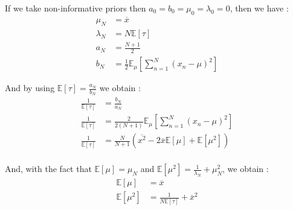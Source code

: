 \documentclass{article}
\begin{document}
If we take non-informative priors then $a_0 = b_0 = \mu_0 = \lambda_0 = 0$, then we have :
\begin{equation}
    \begin{split}
        \mu_N     & = \overline{x}                                                      \\
        \lambda_N & = N\mathbb{E}[\tau]                                                 \\
        a_N       & = \frac{N+1}{2}                                                     \\
        b_N       & = \frac{1}{2}\mathbb{E}_\mu\left[\sum_{n=1}^{N}(x_n - \mu)^2\right]
    \end{split}
\end{equation}

And by using $\mathbb{E}[\tau] = \frac{a_N}{b_N}$ we obtain :
\begin{equation}
    \begin{split}
        \frac{1}{\mathbb{E}[\tau]} & = \frac{b_N}{a_N}                                                                             \\
        \frac{1}{\mathbb{E}[\tau]} & = \frac{2}{2(N+1)}\mathbb{E}_\mu\left[\sum_{n=1}^{N}(x_n - \mu)^2\right]                      \\
        \frac{1}{\mathbb{E}[\tau]} & = \frac{N}{N+1}\left(\overline{x^2} - 2\overline{x}\mathbb{E}[\mu] + \mathbb{E}[\mu^2]\right) \\
    \end{split}
\end{equation}

And, with the fact that $\mathbb{E}[\mu] = \mu_N$ and $\mathbb{E}[\mu^2] = \frac{1}{\lambda_N} + \mu_N^2$, we obtain :
\begin{equation}
    \begin{split}
        \mathbb{E}[\mu]   & = \overline{x}                                 \\
        \mathbb{E}[\mu^2] & = \frac{1}{N\mathbb{E}[\tau]} + \overline{x}^2
    \end{split}
\end{equation}
\end{document}
